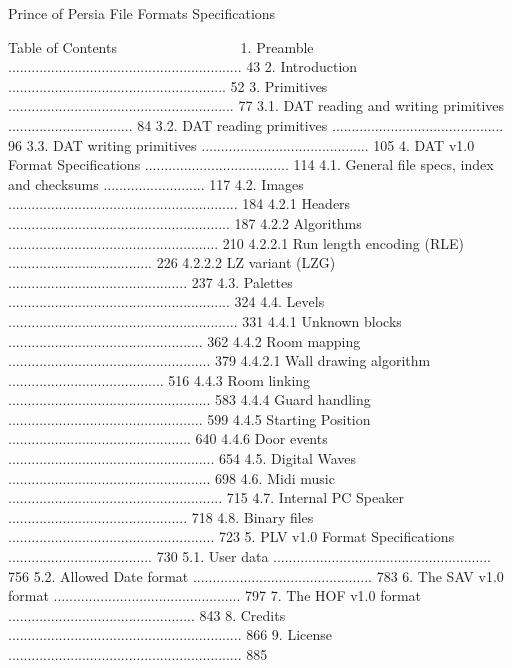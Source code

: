 
                             Prince of Persia
                               File Formats
                              Specifications

Table of Contents
~~~~~ ~~ ~~~~~~~~
1. Preamble ............................................................ 43
2. Introduction ........................................................ 52
3. Primitives .......................................................... 77
3.1. DAT reading and writing primitives ................................ 84
3.2. DAT reading primitives ............................................ 96
3.3. DAT writing primitives ........................................... 105
4. DAT v1.0 Format Specifications ..................................... 114
4.1. General file specs, index and checksums .......................... 117
4.2. Images ........................................................... 184
4.2.1 Headers ......................................................... 187
4.2.2 Algorithms ...................................................... 210
4.2.2.1 Run length encoding (RLE) ..................................... 226
4.2.2.2 LZ variant (LZG) .............................................. 237
4.3. Palettes ......................................................... 324
4.4. Levels ........................................................... 331
4.4.1 Unknown blocks .................................................. 362
4.4.2 Room mapping .................................................... 379
4.4.2.1 Wall drawing algorithm ........................................ 516
4.4.3 Room linking .................................................... 583
4.4.4 Guard handling .................................................. 599
4.4.5 Starting Position ............................................... 640
4.4.6 Door events ..................................................... 654
4.5. Digital Waves .................................................... 698
4.6. Midi music ....................................................... 715
4.7. Internal PC Speaker .............................................. 718
4.8. Binary files ..................................................... 723
5. PLV v1.0 Format Specifications ..................................... 730
5.1. User data ........................................................ 756
5.2. Allowed Date format .............................................. 783
6. The SAV v1.0 format ................................................ 797
7. The HOF v1.0 format ................................................ 843
8. Credits ............................................................ 866
9. License ............................................................ 885



